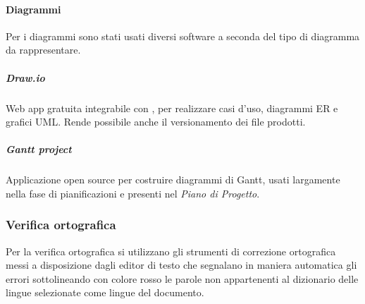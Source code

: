 \paragraph{Diagrammi}
Per i diagrammi sono stati usati diversi software a seconda del tipo di diagramma da rappresentare.
\subparagraph{\textit{Draw.io}}
Web app gratuita integrabile con , per realizzare casi d'uso, diagrammi ER e grafici UML. Rende possibile anche il versionamento dei file prodotti.
\subparagraph{\textit{Gantt project}}
Applicazione open source per costruire diagrammi di Gantt, usati largamente nella fase di pianificazioni e presenti nel \textit{Piano di Progetto}.

\subsubsection{Verifica ortografica}
Per la verifica ortografica si utilizzano gli strumenti di correzione ortografica messi a disposizione dagli editor di testo che segnalano in maniera automatica gli errori sottolineando con colore rosso le parole non appartenenti al dizionario delle lingue selezionate come lingue del documento.
